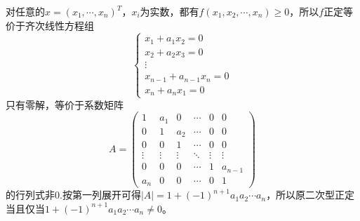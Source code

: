 \documentclass[a4paper]{report}
\begin{document}
\begin{zhengming}
对任意的$x=(x_1,\cdots,x_n)^T$，$x_i$为实数，都有$f(x_1,x_2,\cdots,x_n)\geq 0$，所以$f$正定等价于齐次线性方程组
\begin{equation*}
  \begin{cases}
x_1+a_1x_2=0\\
x_2+a_2x_3=0\\
\vdots\\
x_{n-1}+a_{n-1}x_n=0\\
x_{n}+a_{n}x_1=0
  \end{cases}
\end{equation*}只有零解，等价于系数矩阵
\begin{equation*}
A=
\begin{pmatrix}
1&a_1&0&\cdots&0&0\\
0&1&a_2&\cdots&0&0\\
0&0&1&\cdots&0&0\\
\vdots&\vdots&\vdots&\ddots&\vdots&\vdots\\
0&0&0&\cdots&1&a_{n-1}\\
a_n&0&0&\cdots&0&1
\end{pmatrix}
\end{equation*}
的行列式非0.按第一列展开可得$|A|=1+(-1)^{n+1}a_1a_2\cdots a_n$，所以原二次型正定当且仅当$1+(-1)^{n+1}a_1a_2\cdots a_n\neq 0$。
\end{zhengming}
\end{document}
